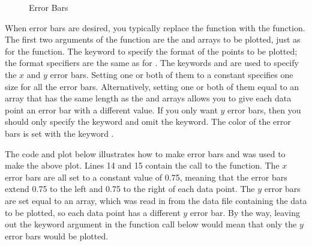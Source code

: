 \documentclass[letterpaper,10pt,english]{sphinxmanual}
\begin{document}
\begin{figure}[htbp]
\centering
\capstart

\noindent{}
\caption{Error Bars}\label{\detokenize{chap5/chap5_plot:id5}}\label{\detokenize{chap5/chap5_plot:fig-expdecay}}\end{figure}

\sphinxAtStartPar
When error bars are desired, you typically replace the  function with the  function.  The first two arguments of the   function are the  and  arrays to be plotted, just as for the  function.  The keyword   to specify the format of the points to be plotted; the format specifiers are the same as for .  The keywords  and  are used to specify the \(x\) and \(y\) error bars.  Setting one or both of them to a constant specifies one size for all the error bars.  Alternatively, setting one or both of them equal to an array that has the same length as the  and  arrays allows you to give each data point an error bar with a different value.  If you only want \(y\) error bars, then you should only specify the  keyword and omit the  keyword.  The color of the error bars is set with the keyword .

\sphinxAtStartPar
The code and plot below illustrates how to make error bars and was used to make the above plot.  Lines 14 and 15 contain the call to the  function.  The \(x\) error bars are all set to a constant value of 0.75, meaning that the error bars extend 0.75 to the left and 0.75 to the right of each data point.  The \(y\) error bars are set equal to an array, which was read in from the data file containing the data to be plotted, so each data point has a different \(y\) error bar.  By the way, leaving out the  keyword argument in the  function call below would mean that only the \(y\) error bars would be plotted.
\end{document}
